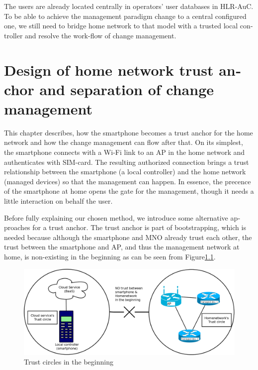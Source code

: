 \documentclass[12pt,a4paper,english]{tutthesis}
\begin{document}
\begin{otherlanguage}{english}
The users are already located centrally in operators' user databases
in HLR-AuC.  To be able
to achieve the management paradigm change to a central configured one,
we still need to bridge home network to that model with a trusted local controller
and resolve the work-flow of change management.


\chapter{Design of home network trust anchor and separation of change management}
\label{sec-4}





This chapter describes, how the smartphone becomes a trust anchor for
the home network and how the change management can flow after that.
On its simplest, the smartphone connects with a Wi-Fi link to an
AP in the home network and authenticates with SIM-card.
The resulting authorized connection brings a trust relationship
between the smartphone (a local controller)
and the home network (managed devices) so that the 
management can happen. 
In essence, the precence of the smartphone at home
opens the gate for the management, though it needs a little
interaction on behalf the user.



Before fully explaining our chosen method, we introduce some 
alternative
approaches for a trust anchor. The trust anchor is part of bootstrapping,
which is needed because although the smartphone and MNO
already trust each other, the trust between the smartphone and AP, and
thus the management network at home, is non-existing in the
beginning as can be seen from Figure\ref{fig:trustbegin}.

\begin{figure}[htb]
\centering
\includegraphics[width=.9\linewidth]{trustcircles.png}
\caption{\label{fig:trustbegin}Trust circles in the beginning}
\end{figure}


\end{otherlanguage}
\end{document}
